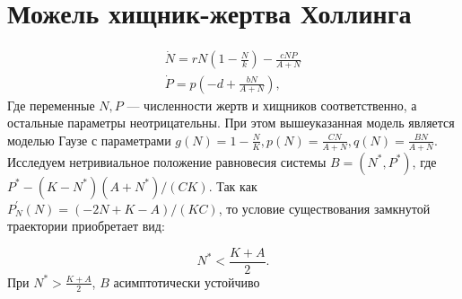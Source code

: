 \section{Можель хищник-жертва Холлинга}
\begin{equation}
	\begin{array}{ll}
		\dot{N} = rN\left(1 - \frac{N}{k}\right) - \frac{cNP}{A+N}\\
		\dot{P} = p\left(-d + \frac{bN}{A+N}\right),
	\end{array}
\end{equation}
 Где переменные $N, P$ --- численности жертв и хищников соответственно, а остальные параметры неотрицательны. При этом вышеуказанная модель является моделью Гаузе с параметрами $g(N) = 1 - \frac{N}{K}, p(N) = \frac{CN}{A+N}, q(N)=\frac{BN}{A+N}$. 
 Исследуем нетривиальное положение равновесия системы $B = (N^*,P^*)$, где $P^* - \left(K - N^*\right) \left( A + N^* \right) / \left( CK \right)$. Так как $P_{N}^{'}(N) = \left( -2N+K-A \right) / \left( KC \right)$, то условие существования замкнутой траектории приобретает вид:
 
 \begin{equation*}
	 N^* < \frac{K+A}{2}.
 \end{equation*}
 При  $N^* > \frac{K+A}{2}$, $B$ асимптотически устойчиво 
